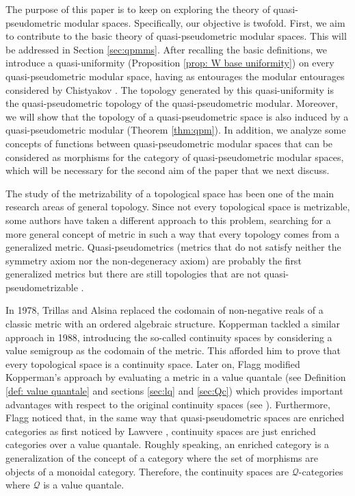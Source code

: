 \documentclass[11pt,a4paper]{amsart}
\theoremstyle{definition}
\begin{document}
	The purpose of this paper is to keep on exploring the theory of quasi-pseudometric modular spaces. Specifically, our objective is twofold. First, we aim to contribute to the basic theory of quasi-pseudometric modular spaces. This will be addressed in Section \ref{sec:qpmms}. After recalling the basic definitions, we introduce a quasi-uniformity (Proposition \ref{prop: W base uniformity}) on every quasi-pseudometric modular space, having as entourages the modular entourages considered by Chistyakov \cite[Section 4.1.2]{Chis15}. The topology generated by this quasi-uniformity is the quasi-pseudometric topology of the quasi-pseudometric modular. Moreover, we will show that the topology of a quasi-pseudometric space is also induced by a quasi-pseudometric modular (Theorem \ref{thm:qpm}). In addition, we analyze some concepts of functions between quasi-pseudometric modular spaces that can be considered as morphisms for the category of quasi-pseudometric modular spaces, which will be necessary for the second aim of the paper that we next discuss. 
	
	The study of the metrizability of a topological space has been one of the main research areas of general topology. Since not every topological space is metrizable, some authors have taken a different approach to this problem, searching for a more general concept of metric in such a way that every topology comes from a generalized metric. Quasi-pseudometrics (metrics that do not satisfy neither the symmetry axiom nor the non-degeneracy axiom) are probably the first generalized metrics but there are still topologies that are not quasi-pseudometrizable \cite{FL82}. 
	
	In 1978, Trillas and Alsina \cite{TrillasAlsina78} replaced the codomain of non-negative reals of a classic metric with an ordered algebraic structure. Kopperman tackled a similar approach \cite{Kopp88} in 1988, introducing the so-called continuity spaces by considering a value semigroup as the codomain of the metric. This afforded him to prove that every topological space is a continuity space.  Later on, Flagg \cite{Flagg97,FlaggKopp97} modified Kopperman's approach by evaluating a metric in a value quantale (see Definition \ref{def: value quantale} and sections \ref{sec:lq} and \ref{sec:Qc}) which provides important advantages with respect to the original continuity spaces (see \cite{CookWeiss21}). Furthermore, Flagg noticed that, in the same way that quasi-pseudometric spaces are enriched categories as first noticed by Lawvere \cite{Lawv73}, continuity spaces are just enriched categories over a value quantale. Roughly speaking, an enriched category is a generalization of the concept of a category where the set of morphisms are objects of a monoidal category. Therefore, the continuity spaces are $\mathscr{Q}$-categories \cite[Section III.1.3]{BookMonoidalTopology} where $\mathscr{Q}$ is a value quantale.
	
\end{document}
